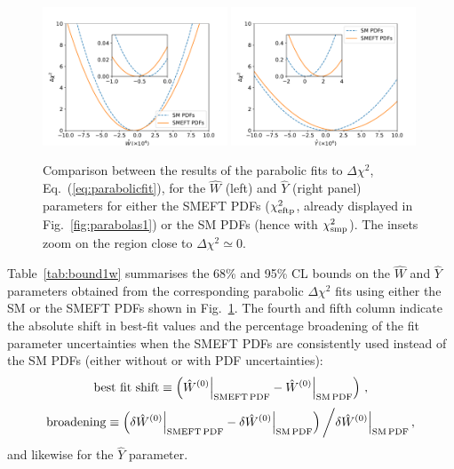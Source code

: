\documentclass[withindex,glossary]{cam-thesis}
\begin{document}
\begin{figure}[t]
\begin{center}
  \includegraphics[width=0.49\textwidth]{dy_figures/W-both-parabs.pdf}
    \includegraphics[width=0.49\textwidth]{dy_figures/Y-both-parabs.pdf}
    \caption{\label{fig:parabolas2} Comparison
      between the results of the parabolic fits to $\Delta\chi^2$, Eq.~(\ref{eq:parabolicfit}),
      for the $\hat{W}$ (left) and $\hat{Y}$ (right panel) parameters for either the SMEFT PDFs
      ($\chi^2_{\rm eftp}$, already displayed in Fig.~\ref{fig:parabolas1}) or
      the SM PDFs (hence with $\chi^2_{\rm smp}$).
      The insets zoom on the region close to $\Delta\chi^2\simeq 0$.
    }
\end{center}
\end{figure}

Table~\ref{tab:bound1w} summarises
the 68\% and 95\% CL bounds on the $\hat{W}$ and $\hat{Y}$
parameters obtained from the corresponding parabolic $\Delta\chi^2$ fits 
using either the SM or the SMEFT PDFs shown in Fig.~\ref{fig:parabolas2}.
%
The fourth and fifth column indicate the absolute shift in best-fit values
and the percentage broadening of the fit parameter uncertainties when the SMEFT PDFs
are consistently used instead of the SM PDFs (either without or with PDF uncertainties):
\begin{equation}
\label{eq:shift}
{\rm best~fit~shift}\equiv \left( \hat{W}^{(0)}\Big|_{\rm SMEFT\,PDF}-\hat{W}^{(0)}\Big|_{\rm SM\,PDF}\right) \, ,
\end{equation}
\begin{equation}
\label{eq:broadening}
{\rm broadening}\equiv \left( \delta\hat{W}^{(0)}\Big|_{\rm SMEFT\,PDF}-\delta\hat{W}^{(0)}\Big|_{\rm SM\,PDF}\right)\bigg/\delta\hat{W}^{(0)}\Big|_{\rm SM\,PDF} \, ,
\end{equation}
and likewise for the $\hat{Y}$ parameter.
\end{document}
